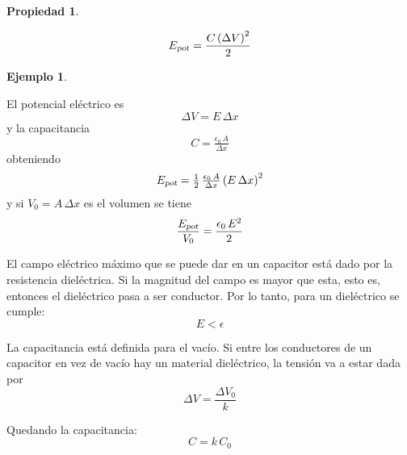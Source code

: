 \documentclass[a5paper,12pt,twoside]{book}
\newtheorem{prop}{{Propiedad}}[chapter]
\newtheorem{example}{{Ejemplo}}[chapter]
\begin{document}
\begin{mdframed}[style=MyFrame1]
    \begin{prop}
    \end{prop}
    \begin{equation*}
        {{E}_\textsl{{pot}}} = \frac{C \left(\Delta V\right)^2}{2}
    \end{equation*}
\end{mdframed}

\begin{mdframed}[style=MyFrame2]
    \begin{example}
    \end{example}

    El potencial eléctrico es
    \begin{equation*}
        \Delta V = E \, \Delta x
    \end{equation*}
    y la capacitancia
    \begin{equation*}
        C = \tfrac{\epsilon_0 \, A}{\Delta x}
    \end{equation*}
    obteniendo
    \begin{equation*}
        {{E}_\textsl{{pot}}} = \tfrac{1}{2} \, \tfrac{\epsilon_0 \, A}{\Delta x} \left(E \, \Delta x\right)^2
    \end{equation*}
    y si $V_0 = A \, \Delta x$ es el volumen se tiene
    \begin{equation*}
        \frac{{{E}_\textsl{{pot}}}}{V_0} = \frac{\epsilon_0 \, E^2}{2}
    \end{equation*}
\end{mdframed}

El campo eléctrico máximo que se puede dar en un capacitor está dado por la resistencia dieléctrica. Si la magnitud del campo es mayor que esta, esto es, entonces el dieléctrico pasa a ser conductor. Por lo tanto, para un dieléctrico se cumple:
\begin{equation*}
    E < \epsilon
\end{equation*}

La capacitancia está definida para el vacío. Si entre los conductores de un capacitor en vez de vacío hay un material dieléctrico, la tensión va a estar dada por
\begin{equation*}
    \Delta V = \frac{\Delta V_0}{k}
\end{equation*}

Quedando la capacitancia:
\begin{equation*}
    C = k \, C_0
\end{equation*}
\end{document}
